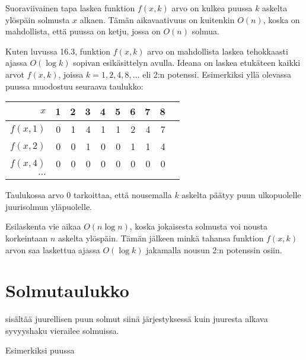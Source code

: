Suoraviivainen tapa laskea funktion $f(x,k)$
arvo on kulkea puussa $k$ askelta ylöspäin
solmusta $x$ alkaen.
Tämän aikavaativuus on kuitenkin $O(n)$,
koska on mahdollista, että puussa on
ketju, jossa on $O(n)$ solmua.

Kuten luvussa 16.3, funktion $f(x,k)$
arvo on mahdollista laskea tehokkaasti ajassa
$O(\log k)$ sopivan esikäsittelyn avulla.
Ideana on laskea etukäteen kaikki arvot
$f(x,k)$, joissa $k=1,2,4,8,\ldots$ eli 2:n potenssi.
Esimerkiksi yllä olevassa puussa muodostuu seuraava taulukko:

\begin{center}
\begin{tabular}{r|rrrrrrrrr}
$x$ & 1 & 2 & 3 & 4 & 5 & 6 & 7 & 8 \\
\hline
$f(x,1)$ & 0 & 1 & 4 & 1 & 1 & 2 & 4 & 7 \\
$f(x,2)$ & 0 & 0 & 1 & 0 & 0 & 1 & 1 & 4 \\
$f(x,4)$ & 0 & 0 & 0 & 0 & 0 & 0 & 0 & 0 \\
$\cdots$ \\
\end{tabular}
\end{center}

Taulukossa arvo 0 tarkoittaa, että nousemalla $k$
askelta päätyy puun ulkopuolelle juurisolmun yläpuolelle.

Esilaskenta vie aikaa $O(n \log n)$, koska jokaisesta
solmusta voi nousta korkeintaan $n$ askelta ylöspäin.
Tämän jälkeen minkä tahansa funktion $f(x,k)$ arvon saa
laskettua ajassa $O(\log k)$ jakamalla nousun 2:n
potenssin osiin.

\section{Solmutaulukko}


 sisältää juurellisen puun solmut siinä
järjestyksessä kuin juuresta alkava syvyyshaku
vierailee solmuissa.

Esimerkiksi puussa
\begin{center}
\end{center}

